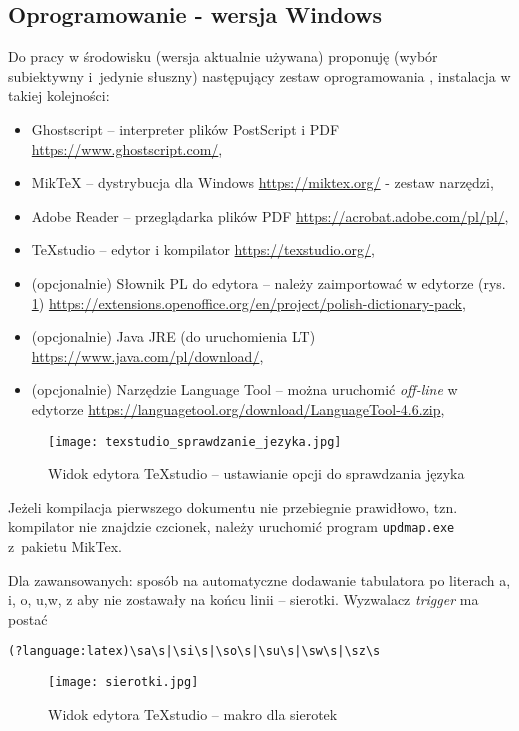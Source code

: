 \subsection{Oprogramowanie - wersja Windows}
\label{sec:oprogramowanie}
Do pracy w środowisku \LaTeXe{} (wersja aktualnie używana) proponuję (wybór subiektywny i~jedynie słuszny) następujący zestaw oprogramowania \cite{Ghostscript, MikTeX, TeXstudio}, instalacja w takiej kolejności:
\begin{itemize}
\item Ghostscript -- interpreter plików PostScript i PDF  \url{https://www.ghostscript.com/},
\item MikTeX -- dystrybucja dla Windows  \url{https://miktex.org/} - zestaw narzędzi,
\item Adobe Reader -- przeglądarka plików PDF \url{https://acrobat.adobe.com/pl/pl/},
\item TeXstudio -- edytor i kompilator \url{https://texstudio.org/},
\item (opcjonalnie) Słownik PL do edytora -- należy zaimportować w edytorze (rys. \ref{fig:rysunek_spr})  \url{https://extensions.openoffice.org/en/project/polish-dictionary-pack},
\item (opcjonalnie) Java JRE (do uruchomienia LT) \url{https://www.java.com/pl/download/},
\item (opcjonalnie) Narzędzie Language Tool -- można uruchomić \textit{off-line} w edytorze \url{https://languagetool.org/download/LanguageTool-4.6.zip},
\end{itemize}

\begin{figure}[h]
	\centering
	\texttt{[image: texstudio\_sprawdzanie\_jezyka.jpg]}
	\caption{\label{fig:rysunek_spr}Widok edytora TeXstudio -- ustawianie opcji do sprawdzania języka}
\end{figure}

Jeżeli kompilacja pierwszego dokumentu nie przebiegnie prawidłowo, tzn. kompilator nie znajdzie czcionek, należy uruchomić program \texttt{updmap.exe} z~pakietu MikTex.

Dla zawansowanych: sposób na automatyczne dodawanie tabulatora po literach a, i, o, u,w, z aby nie zostawały na końcu linii -- sierotki. Wyzwalacz \textit{trigger} ma postać \begin{verbatim}
(?language:latex)\sa\s|\si\s|\so\s|\su\s|\sw\s|\sz\s
\end{verbatim}

\begin{figure}[h]
	\centering
	\texttt{[image: sierotki.jpg]}
	\caption{\label{fig:sierotki}Widok edytora TeXstudio -- makro dla sierotek}
\end{figure}

